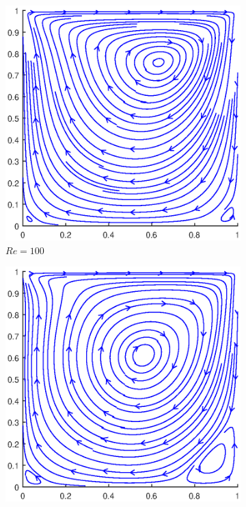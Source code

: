 \begin{figure}[h]
	\centering
	\begin{subfigure}{0.5\textwidth}
		\includegraphics[scale=0.61]{DrivenCavity/100}
		\caption{$Re=100$}
	\end{subfigure}%
	\begin{subfigure}{0.5\textwidth}
		\includegraphics[scale=0.61]{DrivenCavity/400}

\end{subfigure}
\end{figure}

